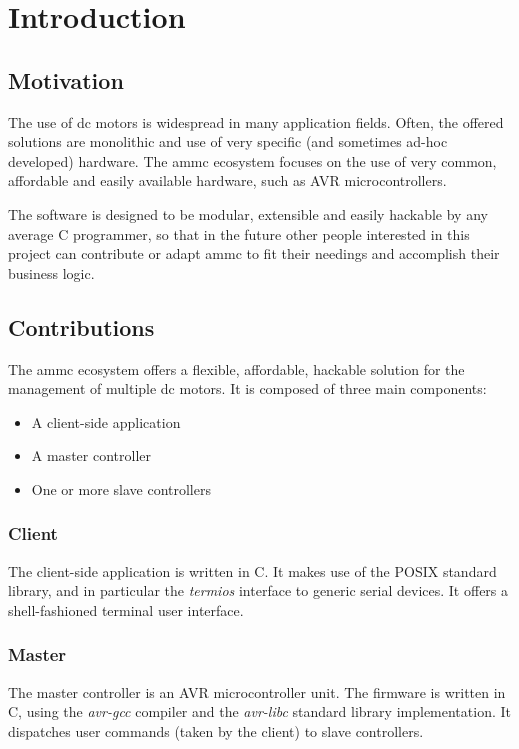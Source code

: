 \documentclass[binding=0.6cm,Lau]{sapthesis}
\begin{document}
\tableofcontents
\listoffigures
\listoftables

\mainmatter

\chapter{Introduction}
\label{ch:intro}

\section{Motivation}
The use of dc motors is widespread in many application fields. Often, the
offered solutions are monolithic and use of very specific (and sometimes ad-hoc
developed) hardware. The ammc ecosystem focuses on the use of very common,
affordable and easily available hardware, such as AVR microcontrollers.

The software is designed to be modular, extensible and easily hackable by any
average C programmer, so that in the future other people interested in this
project can contribute or adapt ammc to fit their needings and accomplish their
business logic.

\section{Contributions}
The ammc ecosystem offers a flexible, affordable, hackable solution for the
management of multiple dc motors. It is composed of three main components:

\begin{itemize}
  \item A client-side application
  \item A master controller
  \item One or more slave controllers
\end{itemize}

\subsection{Client}
The client-side application is written in C. It makes use of the POSIX standard
library, and in particular the \emph{termios} interface to generic serial
devices. It offers a shell-fashioned terminal user interface.

\subsection{Master}
The master controller is an AVR microcontroller unit. The firmware is written
in C, using the \emph{avr-gcc} compiler and the \emph{avr-libc} standard
library implementation. It dispatches user commands (taken by the client) to
slave controllers.
\end{document}
